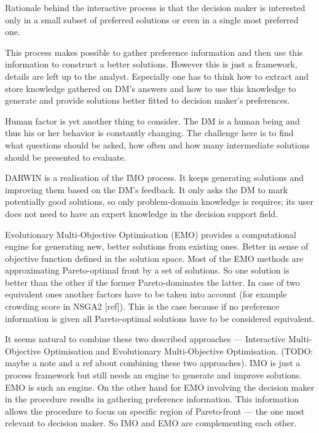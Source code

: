 Rationale behind the interactive process is that the decision maker is
interested only in a small subset of preferred solutions or even in a single
most preferred one.

This process makes possible to gather preference information and then use this
information to construct a better solutions. However this is just a framework,
details are left up to the analyst. Especially one has to think how to extract
and store knowledge gathered on DM's answers and how to use this knowledge to
generate and provide solutions better fitted to decision maker's preferences.

Human factor is yet another thing to consider. The DM is a human being and
thus his or her behavior is constantly changing. The challenge here is to find
what questions should be asked, how often and how many intermediate solutions
should be presented to evaluate.

DARWIN is a realisation of the IMO process. It keeps generating solutions and
improving them based on the DM's feedback. It only asks the DM to mark
potentially good solutions, so only problem-domain knowledge is requires; its
user does not need to have an expert knowledge in the decision support field.

Evolutionary Multi-Objective Optimisation (EMO) provides a computational engine
for generating new, better solutions from existing ones. Better in sense of
objective function defined in the solution space. Most of the EMO methods are
approximating Pareto-optimal front by a set of solutions. So one solution is
better than the other if the former Pareto-dominates the latter. In case of
two equivalent ones another factors have to be taken into account (for example
crowding score in NSGA2 [ref]). This is the case because if no preference
information is given all Pareto-optimal solutions have to be considered
equivalent.

It seems natural to combine these two described approaches --- Interactive
Multi-Objective Optimisation and Evolutionary Multi-Objective
Optimisation. (TODO: maybe a note and a ref about combining these two
approaches). IMO is just a process framework but still needs an engine to
generate and improve solutions. EMO is such an engine. On the other hand for
EMO involving the decision maker in the procedure results in gathering
preference information. This information allows the procedure to focus on
specific region of Pareto-front --- the one most relevant to decision
maker. So IMO and EMO are complementing each other.

